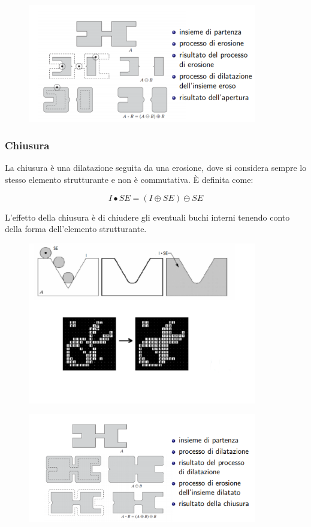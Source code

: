 \begin{figure}[H]
    \centering
    \includegraphics[width=10cm, keepaspectratio]{capitoli/immagini/imgs/apertura_bella.png}
\end{figure}

\subsubsection{Chiusura}

La chiusura è una dilatazione seguita da una erosione, dove si considera sempre lo stesso elemento strutturante e non è
commutativa. È definita come:

$$
    I \bullet SE = (I \oplus SE) \ominus SE
$$

L'effetto della chiusura è di chiudere gli eventuali buchi interni tenendo conto della forma dell'elemento strutturante.

\begin{figure}[H]
    \centering
    \includegraphics[width=10cm, keepaspectratio]{capitoli/immagini/imgs/chiusura.png}
\end{figure}

\begin{figure}[H]
    \centering
    \includegraphics[width=10cm, keepaspectratio]{capitoli/immagini/imgs/chiusura_bella.png}
\end{figure}

